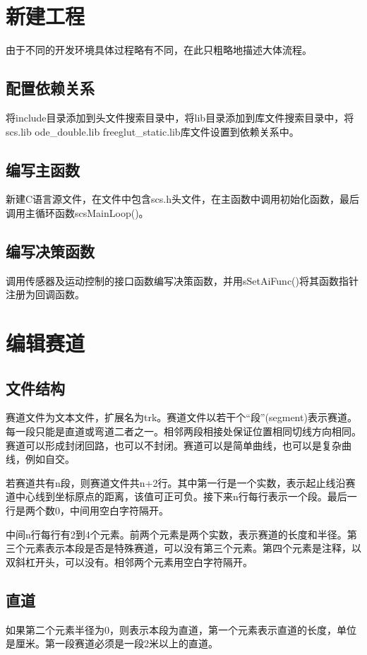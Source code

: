 \documentclass[titlepage,a4paper]{ctexart}
\begin{document}
\newpage
\section{新建工程}
由于不同的开发环境具体过程略有不同，在此只粗略地描述大体流程。

\subsection{配置依赖关系}
将include目录添加到头文件搜索目录中，将lib目录添加到库文件搜索目录中，将scs.lib ode\_double.lib freeglut\_static.lib库文件设置到依赖关系中。

\subsection{编写主函数}
新建C语言源文件，在文件中包含scs.h头文件，在主函数中调用初始化函数，最后调用主循环函数scsMainLoop()。

\subsection{编写决策函数}
调用传感器及运动控制的接口函数编写决策函数，并用sSetAiFunc()将其函数指针注册为回调函数。
\newpage
\section{编辑赛道}
\subsection{文件结构}
赛道文件为文本文件，扩展名为trk。赛道文件以若干个“段”(segment)表示赛道。每一段只能是直道或弯道二者之一。相邻两段相接处保证位置相同切线方向相同。赛道可以形成封闭回路，也可以不封闭。赛道可以是简单曲线，也可以是复杂曲线，例如自交。

若赛道共有n段，则赛道文件共n+2行。其中第一行是一个实数，表示起止线沿赛道中心线到坐标原点的距离，该值可正可负。接下来n行每行表示一个段。最后一行是两个数0，中间用空白字符隔开。

中间n行每行有2到4个元素。前两个元素是两个实数，表示赛道的长度和半径。第三个元素表示本段是否是特殊赛道，可以没有第三个元素。第四个元素是注释，以双斜杠开头，可以没有。相邻两个元素用空白字符隔开。
\subsection{直道}
如果第二个元素半径为0，则表示本段为直道，第一个元素表示直道的长度，单位是厘米。第一段赛道必须是一段2米以上的直道。
\end{document}
